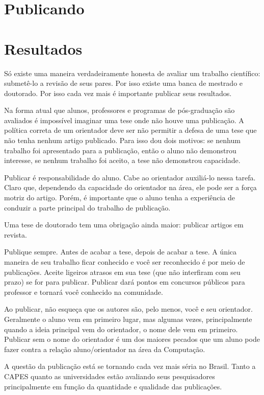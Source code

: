 \chapter{Publicando}

\chapter{Resultados}

Só existe uma maneira verdadeiramente honesta de avaliar um trabalho científico: submetê-lo a revisão de seus pares. Por isso existe uma banca de mestrado e doutorado. Por isso cada vez mais é importante publicar seus resultados.

Na forma atual que alunos, professores e programas de pós-graduação são avaliados é impossível imaginar uma tese onde não houve uma publicação.
A política correta de um orientador deve ser não permitir a defesa de uma tese que não tenha nenhum artigo publicado. Para isso dou dois motivos: se nenhum trabalho foi apresentado para a publicação, então o aluno não demonstrou interesse, se nenhum trabalho foi aceito, a tese não demonstrou capacidade.

Publicar é responsabilidade do aluno. Cabe ao orientador auxiliá-lo nessa tarefa. Claro que, dependendo da capacidade do orientador na área, ele pode ser a força motriz do artigo. Porém, é importante que o aluno tenha a experiência de conduzir a parte principal do trabalho de publicação.

Uma tese de doutorado tem uma obrigação ainda maior: publicar artigos em revista.

Publique sempre. Antes de acabar a tese, depois de acabar a tese. A única maneira de seu trabalho ficar conhecido e você ser reconhecido é por meio de publicações. Aceite ligeiros atrasos em sua tese (que não interfiram com seu prazo) se for para publicar. Publicar dará pontos em concursos públicos para professor e tornará você conhecido na comunidade.

Ao publicar, não esqueça que os autores são, pelo menos, você e seu orientador. Geralmente o aluno vem em primeiro lugar, mas algumas vezes, principalmente quando a ideia principal vem do orientador, o nome dele vem em primeiro. Publicar sem o nome do orientador é um dos maiores pecados que um aluno pode fazer contra a relação aluno/orientador na área da Computação.

A questão da publicação está se tornando cada vez mais séria no Brasil. Tanto a CAPES quanto as universidades estão avaliando seus pesquisadores principalmente em função da quantidade e qualidade das publicações.

